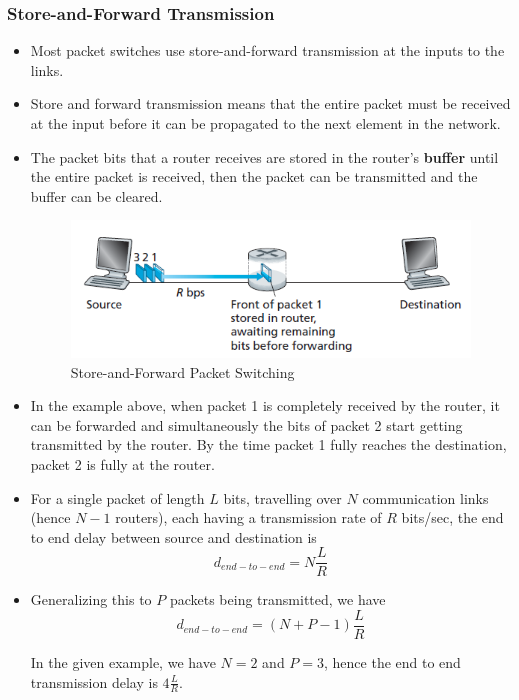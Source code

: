 \documentclass{article}
\theoremstyle{plain}
\theoremstyle{definition}
\begin{document}
\subsubsection{Store-and-Forward Transmission}
    \begin{itemize}
        \item Most packet switches use store-and-forward transmission at the inputs to the links.
        
        \item Store and forward transmission means that the entire packet must be received at the input before it can be propagated to the next element in the network. 
        
        \item The packet bits that a router receives are stored in the router's \textbf{buffer} until the entire packet is received, then the packet can be transmitted and the buffer can be cleared. 
        
        \begin{figure}[h]
            \centering
            \includegraphics{cn6.png}
            \caption{Store-and-Forward Packet Switching}
            \label{fig:my_label_6}
        \end{figure}
        
        \item In the example above, when packet 1 is completely received by the router, it can be forwarded and simultaneously the bits of packet 2 start getting transmitted by the router. By the time packet 1 fully reaches the destination, packet 2 is fully at the router. 
        
        \item For a single packet of length $L$ bits, travelling over $N$ communication links (hence $N-1$ routers), each having a transmission rate of $R$ bits/sec, the end to end delay between source and destination is 
        \begin{equation}
            d_{end-to-end} = N \frac{L}{R}
        \end{equation}
        
        \item Generalizing this to $P$ packets being transmitted, we have
        \begin{equation}
            d_{end-to-end} = (N+P-1)\frac{L}{R}
        \end{equation}
        
        In the given example, we have $N=2$ and $P=3$, hence the end to end transmission delay is $4\frac{L}{R}$.
    \end{itemize}
    
\end{document}
